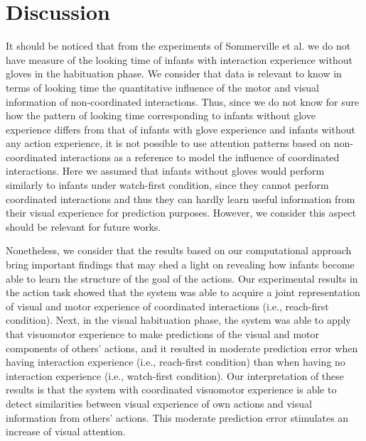\documentclass[conference]{IEEEtran}
\begin{document}
\section{Discussion}
It should be noticed that from the experiments of Sommerville et al. \cite{sommerville2005action} we do not have measure of the looking time of infants with interaction experience without gloves in the habituation phase. We consider that data is relevant to know in terms of looking time the quantitative influence of the motor and visual information of non-coordinated interactions. Thus, since we do not know for sure how the pattern of looking time corresponding to infants without glove experience differs from that of infants with glove experience and infants without any action experience, it is not possible to use attention patterns based on non-coordinated interactions as a reference to model the influence of coordinated interactions. Here we assumed that infants without gloves would perform similarly to infants under watch-first condition, since they cannot perform coordinated interactions and thus they can hardly learn useful information from their visual experience for prediction purposes. However, we consider this aspect should be relevant for future works.

Nonetheless, we consider that the results based on our computational approach bring important findings that may shed a light on revealing how infants become able to learn the structure of the goal of the actions. Our experimental results in the action task showed that the system was able to acquire a joint representation of visual and motor experience of coordinated interactions (i.e., reach-first condition). Next, in the visual habituation phase, the system was able to apply that visuomotor experience to make predictions of the visual and motor components of others' actions, and it resulted in moderate prediction error when having interaction experience (i.e., reach-first condition) than when having no interaction experience (i.e., watch-first condition). Our interpretation of these results is that the system with coordinated visuomotor experience is able to detect similarities between visual experience of own actions and visual information from others' actions. This moderate prediction error stimulates an increase of visual attention.
\end{document}
